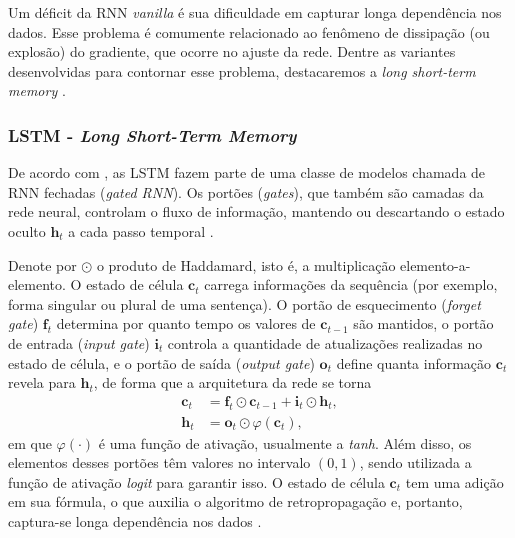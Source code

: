 \documentclass[twoside]{automatextcc}
\newcommand{\bs}[1]{\boldsymbol{#1}}
\begin{document}
Um déficit da RNN \textit{vanilla} é sua dificuldade em capturar longa dependência nos dados. Esse problema é comumente relacionado ao fenômeno de dissipação (ou explosão) do gradiente, que ocorre no ajuste da rede. Dentre as variantes desenvolvidas para contornar esse problema, destacaremos a \textit{long short-term memory} \citep{goodfellow2016, fan2021}.



\subsubsection{LSTM - \textit{Long Short-Term Memory}}
De acordo com \citet{goodfellow2016}, as LSTM fazem parte de uma classe de modelos chamada de RNN fechadas (\textit{gated RNN}). Os portões (\textit{gates}), que também são camadas da rede neural, controlam o fluxo de informação, mantendo ou descartando o estado oculto $\bs{h}_{t}$ a cada passo temporal \citep{kamath2019}. 

Denote por $\odot$ o produto de Haddamard, isto é, a multiplicação elemento-a-elemento. O estado de célula $\bs{c}_t$ carrega informações da sequência (por exemplo, forma singular ou plural de uma sentença). O portão de esquecimento (\textit{forget gate}) $\bs{f}_t$ determina por quanto tempo os valores de $\bs{c}_{t-1}$ são mantidos, o portão de entrada (\textit{input gate}) $\bs{i}_t$ controla a quantidade de atualizações realizadas no estado de célula, e o portão de saída (\textit{output gate}) $\bs{o}_t$ define quanta informação $\bs{c}_t$ revela para $\bs{h}_t$, de forma que a arquitetura da rede se torna 
\begin{align*}
    \bs{c}_{t} & = \bs{f}_{t} \odot \bs{c}_{t-1} + \bs{i}_{t} \odot \bs{h}_{t}, \\
    \bs{h}_{t} & = \bs{o}_{t} \odot \varphi(\bs{c}_{t}),
\end{align*}
em que $\varphi(\cdot)$ é uma função de ativação, usualmente a \textit{tanh}. Além disso, os elementos desses portões têm valores no intervalo $(0,1)$, sendo utilizada a função de ativação \textit{logit} para garantir isso. O estado de célula $\bs{c}_t$ tem uma adição em sua fórmula, o que auxilia o algoritmo de retropropagação e, portanto, captura-se longa dependência nos dados \citep{goodfellow2016, fan2021}.
\end{document}
